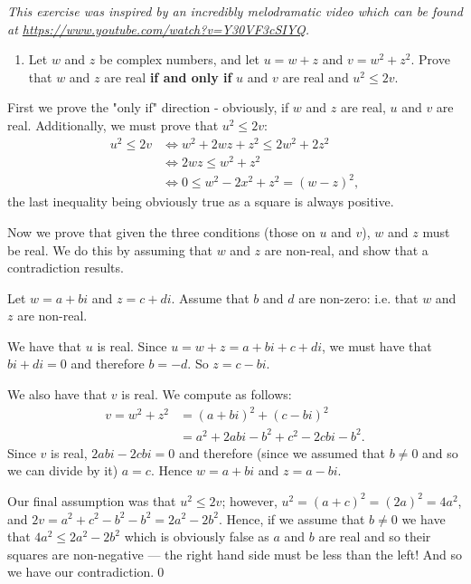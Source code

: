 \documentclass[a4paper,10pt]{article}
\newcommand{\answer}{\bfseries\color{Emerald}\refstepcounter{enumi}\item[\theenumi.]}
\begin{document}
\begin{mdframed}[hidealllines=true,backgroundcolor=Emerald!20]
\textit{This exercise was inspired by an incredibly melodramatic video which can be found at \url{https://www.youtube.com/watch?v=Y30VF3cSIYQ}.}
\end{mdframed}

\filbreak\begin{enumerate}[resume]
  \answer Let $ w $ and $ z $ be complex numbers, and let $ u = w + z $ and $ v = w^2 + z^2 $. Prove
        that $ w $ and $ z $ are real \textbf{if and only if} $ u $ and $ v $ are real and $ u^2 \leq 2v$.
\end{enumerate}

First we prove the "only if" direction - obviously, if $ w $ and $ z $ are real, $ u $ and $ v $ are real.
Additionally, we must prove that $ u^2 \leq 2v $:
\begin{align*}
  u^2 \leq 2v &\iff w^2 + 2wz + z^2 \leq 2w^2 + 2z^2\\
              &\iff 2wz \leq w^2 + z^2\\
              &\iff 0 \leq w^2 - 2x^2 + z^2 = (w - z)^2,
\end{align*}
the last inequality being obviously true as a square is always positive.

Now we prove that given the three conditions (those on $ u $ and $ v $), $ w $ and $ z $ must be real. We do this by assuming
that $ w $ and $ z $ are non-real, and show that a contradiction results.

Let $ w = a+bi $ and $ z = c + di $. Assume that $ b $ and $ d $ are non-zero: i.e. that $ w $ and $ z $ are non-real.

We have that $ u $ is real. Since $ u = w + z = a + bi + c + di $, we must have that $ bi + di = 0 $ and therefore
$ b = -d $. So $ z = c - bi $.

We also have that $ v $ is real. We compute as follows:
\begin{align*}
  v = w^2 + z^2 &= (a + bi)^2 + (c - bi)^2\\
                &= a^2 + 2abi - b^2 + c^2 - 2cbi - b^2.
\end{align*}
Since $ v $ is real, $ 2abi - 2cbi = 0 $ and therefore (since we assumed that
$ b \neq 0 $ and so we can divide by it) $ a = c $. Hence $ w = a + bi $
and $ z = a - bi $.

Our final assumption was that $ u^2 \leq 2v $; however, $ u^2 = (a+c)^2 = (2a)^2 = 4a^2 $,
and $ 2v = a^2 + c^2 - b^2 - b^2 = 2a^2 - 2b^2 $. Hence, if we assume that $ b \neq 0 $ we
have that $ 4a^2 \leq 2a^2 - 2b^2 $ which is obviously false as $ a $ and $ b $ are real and
so their squares are non-negative --- the right hand side must be less than the left! And so we
have our contradiction.\qed
\end{document}
